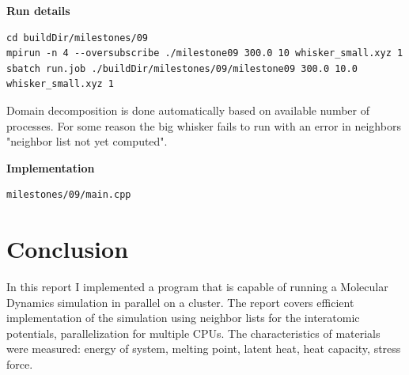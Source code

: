 \documentclass[12pt,a4paper]{article}
\begin{document}
{\bf Run details}
\begin{lstlisting}[breaklines]
cd buildDir/milestones/09
mpirun -n 4 --oversubscribe ./milestone09 300.0 10 whisker_small.xyz 1
sbatch run.job ./buildDir/milestones/09/milestone09 300.0 10.0 whisker_small.xyz 1
\end{lstlisting}

Domain decomposition is done automatically based on available number of processes.
For some reason the big whisker fails to run with an error in neighbors "neighbor list not yet computed".

{\bf Implementation}
\begin{lstlisting}[breaklines]
milestones/09/main.cpp
\end{lstlisting}

\clearpage
\section{Conclusion}
\label{conclusion}

In this report I implemented a program that is capable of running a Molecular Dynamics simulation in parallel on a cluster. The report covers efficient implementation of the simulation using neighbor lists for the interatomic potentials, parallelization for multiple CPUs. The characteristics of materials were measured: energy of system, melting point, latent heat, heat capacity, stress force.

\newpage
{\small
	
	
}
\end{document}
